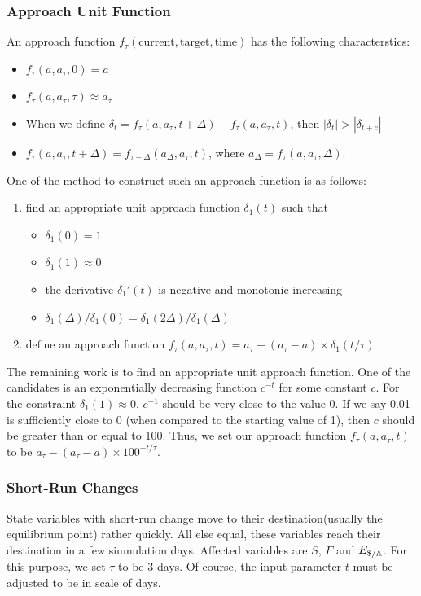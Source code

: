 \documentclass[a4paper,11pt]{scrartcl}
\newcommand{\usd}{\text{\textdollar}}
\newcommand{\amom}{\mathbb{A}}
\begin{document}
\subsubsection{Approach Unit Function}
An approach function $f_\tau(\text{current}, \text{target}, \text{time})$ has
the following characterstics:
\begin{itemize}
	\item{$f_\tau(a, a_\tau, 0) = a$}
	\item{$f_\tau(a, a_\tau, \tau) \approx a_\tau$}
	\item{When we define $\delta_t = f_\tau(a, a_\tau, t + \Delta) - f_\tau(a,
			a_\tau, t)$, then $|\delta_t| > |\delta_{t+c}|$}
	\item{$f_\tau(a, a_\tau, t+\Delta) = f_{\tau-\Delta}(a_\Delta, a_\tau,
		t)$}, where $a_\Delta = f_\tau(a, a_\tau, \Delta)$.
\end{itemize}

One of the method to construct such an approach function is as follows:
\begin{enumerate}
	\item{find an appropriate unit approach function $\delta_1(t)$ such that}
		\begin{itemize}
			\item{$\delta_1(0) = 1$}
			\item{$\delta_1(1) \approx 0$}
			\item{the derivative $\delta_1'(t)$ is negative and monotonic
				increasing}
			\item{$\delta_1(\Delta) / \delta_1(0) = 
				\delta_1(2\Delta) / \delta_1(\Delta)$}
		\end{itemize}
	\item{define an approach function
		$f_\tau(a, a_\tau, t) = a_\tau - (a_\tau - a) \times \delta_1(t/\tau)$}
\end{enumerate}
The remaining work is to find an appropriate unit approach function. One of the
candidates is an exponentially decreasing function $c^{-t}$ for some constant
$c$. For the constraint $\delta_1(1) \approx 0$, $c^{-1}$ should be very close
to the value 0. If we say 0.01 is sufficiently close to 0 (when compared to the
starting value of 1), then $c$ should be greater than or equal to 100. Thus,
we set our approach function $f_\tau(a, a_\tau, t)$ to be $a_\tau - (a_\tau -
a) \times 100^{-t/\tau}$.

\subsubsection{Short-Run Changes}
State variables with short-run change move to their destination(usually the
equilibrium point) rather quickly. All else equal, these variables reach their
destination in a few siumulation days. Affected variables are $S$, $F$ and
$E_{\usd/\amom}$. For this purpose, we set $\tau$ to be 3 days. Of course, the
input parameter $t$ must be adjusted to be in scale of days.
\end{document}
